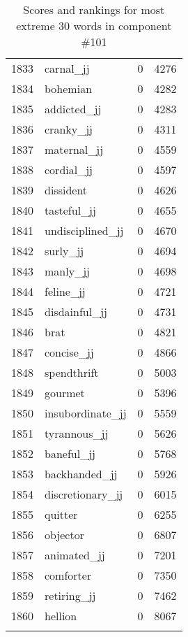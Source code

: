 \begin{longtable}[!htbp]{| rlr@{.}l |}
    1833 & carnal\_jj & 0 & 4276 \\
    1834 & bohemian & 0 & 4282 \\
    1835 & addicted\_jj & 0 & 4283 \\
    1836 & cranky\_jj & 0 & 4311 \\
    1837 & maternal\_jj & 0 & 4559 \\
    1838 & cordial\_jj & 0 & 4597 \\
    1839 & dissident & 0 & 4626 \\
    1840 & tasteful\_jj & 0 & 4655 \\
    1841 & undisciplined\_jj & 0 & 4670 \\
    1842 & surly\_jj & 0 & 4694 \\
    1843 & manly\_jj & 0 & 4698 \\
    1844 & feline\_jj & 0 & 4721 \\
    1845 & disdainful\_jj & 0 & 4731 \\
    1846 & brat & 0 & 4821 \\
    1847 & concise\_jj & 0 & 4866 \\
    1848 & spendthrift & 0 & 5003 \\
    1849 & gourmet & 0 & 5396 \\
    1850 & insubordinate\_jj & 0 & 5559 \\
    1851 & tyrannous\_jj & 0 & 5626 \\
    1852 & baneful\_jj & 0 & 5768 \\
    1853 & backhanded\_jj & 0 & 5926 \\
    1854 & discretionary\_jj & 0 & 6015 \\
    1855 & quitter & 0 & 6255 \\
    1856 & objector & 0 & 6807 \\
    1857 & animated\_jj & 0 & 7201 \\
    1858 & comforter & 0 & 7350 \\
    1859 & retiring\_jj & 0 & 7462 \\
    1860 & hellion & 0 & 8067 \\
    \hline
    \caption{Scores and rankings for most extreme 30 words in component \#101} \\
\end{longtable}
